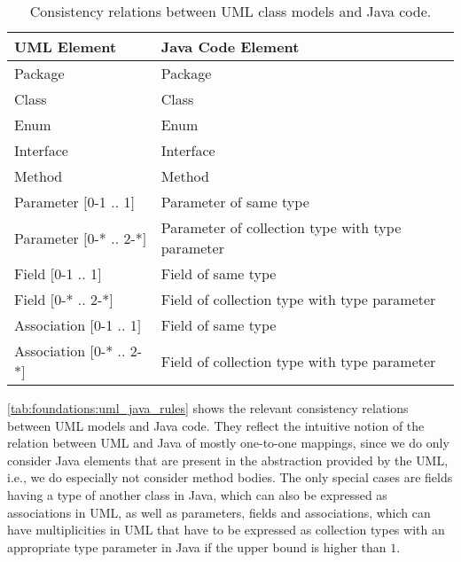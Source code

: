\begin{table}
	\centering 
    \small
    \renewcommand{\arraystretch}{1.4}
	\begin{tabular}{p{3cm} p{6.8cm}}
		\toprule
        \textbf{\gls{UML} Element}  & \textbf{Java Code Element} \\
        \midrule
        Package                         & Package\\
		Class                           & Class\\
		Enum		                    & Enum \\
		Interface		   	            & Interface \\
        Method                          & Method \\
        Parameter $[$0-1 .. 1$]$        & Parameter of same type \\
        Parameter $[$0-* .. 2-*$]$      & Parameter of collection type with type parameter \\
        Field $[$0-1 .. 1$]$            & Field of same type\\
        Field $[$0-* .. 2-*$]$          & Field of collection type with type parameter\\
        Association $[$0-1 .. 1$]$      & Field of same type\\
        Association $[$0-* .. 2-*$]$    & Field of collection type with type parameter\\
		\bottomrule
	\end{tabular}
	\caption[Consistency relation between \acrshort{UML} and Java]{Consistency relations between \gls{UML} class models and Java code.}
	\label{tab:foundations:uml_java_rules}
\end{table}

\autoref{tab:foundations:uml_java_rules} shows the relevant consistency relations between \gls{UML} models and Java code.
They reflect the intuitive notion of the relation between \gls{UML} and Java of mostly one-to-one mappings, since we do only consider Java elements that are present in the abstraction provided by the \gls{UML}, i.e., we do especially not consider method bodies.
The only special cases are fields having a type of another class in Java, which can also be expressed as associations in \gls{UML}, as well as parameters, fields and associations, which can have multiplicities in \gls{UML} that have to be expressed as collection types with an appropriate type parameter in Java if the upper bound is higher than $1$.



